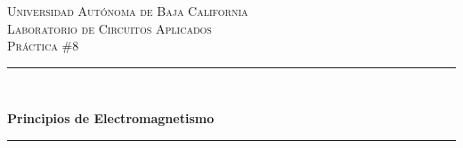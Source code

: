 \documentclass[12pt, letterpaper]{article}
\begin{document}

\begin{titlepage} %
	\vspace*{-3cm}
	\hspace*{-2.5cm}
	\newcommand{\HRule}{\rule{\linewidth}{0.5mm}} %
	\center %
	
	
	\textsc{\LARGE Universidad Autónoma de Baja California}\\[1.5cm] %
	
	\textsc{\Large Laboratorio de Circuitos Aplicados}\\[0.5cm] %
	
	\textsc{\large Práctica \#8}\\[0.5cm] %
	
	
	\HRule\\[0.4cm]
	
	{\huge\bfseries Principios de Electromagnetismo\\[0.4cm] %
	
	\HRule\\[1.5cm]
	
	
}
\end{titlepage}
\end{document}
